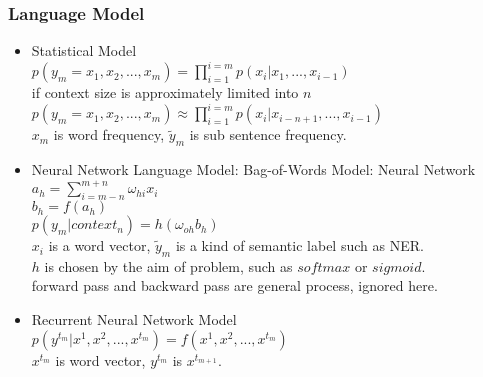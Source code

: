 \begin{frame}
\frametitle{Language Model}
	\scriptsize
	\begin{itemize}
		\item Statistical Model\\
		\hspace{0.5cm}$p(y_m=x_1,x_2,...,x_m)=\prod_{i=1}^{i=m}p(x_i|x_1,...,x_{i-1})$
		\\ \hspace{0.5cm}if context size is approximately limited into $n$
		\\ \hspace{0.5cm}$p(y_m=x_1,x_2,...,x_m)\approx\prod_{i=1}^{i=m}p(x_i|x_{i-n+1},...,x_{i-1})$
		\\\hspace{0.5cm}$x_m$ is word frequency, $\widetilde{y}_m$ is sub sentence frequency.
		\item Neural Network Language Model: Bag-of-Words Model: Neural Network
		\\\hspace{0.5cm}$a_h=\sum_{i=m-n}^{m+n}\omega_{hi}x_i$
		\\\hspace{0.5cm}$b_h=f(a_h)$
		\\\hspace{0.5cm}$p(y_m|context_n)=h(\omega_{oh}b_h)$
		\\\hspace{0.5cm}$x_i$ is a word vector, $\widetilde{y}_m$ is a kind of semantic label such as NER.
		\\\hspace{0.5cm}$h$ is chosen by the aim of problem, such as $softmax$ or $sigmoid$.
		\\\hspace{0.5cm}forward pass and backward pass are general process, ignored here.
		\item Recurrent Neural Network Model
		\\\hspace{0.5cm}$p(y^{t_m}|x^1,x^2,...,x^{t_m})=f(x^1,x^2,...,x^{t_m})$
		\\\hspace{0.5cm}$x^{t_m}$ is word vector, $y^{t_m}$ is $x^{t_{m+1}}$.
	\end{itemize}
\end{frame}
